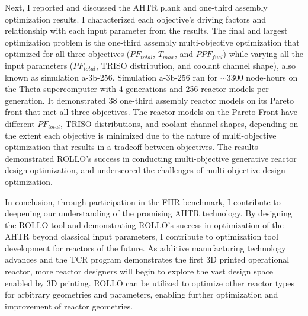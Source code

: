 Next, I reported and discussed the \gls{AHTR} plank and one-third assembly optimization 
results.  
I characterized each objective's driving factors and relationship with each input 
parameter from the results. 
The final and largest optimization problem is the one-third assembly multi-objective 
optimization that optimized for all three objectives ($PF_{total}$, $T_{max}$, and 
$PPF_{fuel}$) while varying all the input parameters ($PF_{total}$, TRISO distribution, 
and coolant channel shape), also known as simulation a-3b-256. 
Simulation a-3b-256 ran for $\sim 3300$ node-hours on the Theta supercomputer with 
4 generations and 256 reactor models per generation. 
It demonstrated 38 one-third assembly reactor models on its Pareto front that met all 
three objectives. 
The reactor models on the Pareto Front have different $PF_{total}$, TRISO distributions, 
and coolant channel shapes, depending on the extent each objective is minimized due 
to the nature of multi-objective optimization that results in a tradeoff between 
objectives. 
The results demonstrated \gls{ROLLO}'s success in conducting multi-objective generative 
reactor design optimization, and underscored the challenges of multi-objective 
design optimization. 

In conclusion, through participation in the \gls{FHR} benchmark, I contribute to 
deepening our understanding of the promising \gls{AHTR} technology. 
By designing the \gls{ROLLO} tool and demonstrating \gls{ROLLO}'s success in 
optimization of the \gls{AHTR} beyond classical input parameters, I contribute to 
optimization tool development for reactors of the future. 
As additive manufacturing technology advances and the \gls{TCR} program 
demonstrates the first 3D printed operational reactor, more reactor designers 
will begin to explore the vast design space enabled by 3D printing. 
\gls{ROLLO} can be utilized to optimize other reactor types for arbitrary
geometries and parameters, enabling further optimization and improvement of reactor 
geometries.
